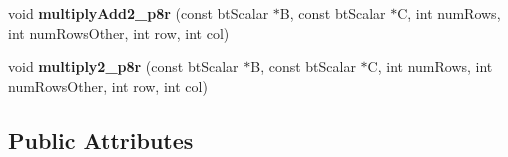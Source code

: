 \begin{DoxyCompactItemize}
\item 
\hypertarget{structbt_matrix_x_ac1fa934d92fd3c7844e58febb00efb0b}{void {\bfseries multiply\+Add2\+\_\+p8r} (const bt\+Scalar $\ast$B, const bt\+Scalar $\ast$C, int num\+Rows, int num\+Rows\+Other, int row, int col)}\label{structbt_matrix_x_ac1fa934d92fd3c7844e58febb00efb0b}

\item 
\hypertarget{structbt_matrix_x_aae657343aaac366b1d255fde09b2c8c5}{void {\bfseries multiply2\+\_\+p8r} (const bt\+Scalar $\ast$B, const bt\+Scalar $\ast$C, int num\+Rows, int num\+Rows\+Other, int row, int col)}\label{structbt_matrix_x_aae657343aaac366b1d255fde09b2c8c5}

\end{DoxyCompactItemize}
\subsection*{Public Attributes}
